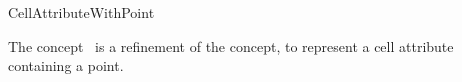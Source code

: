 \ccRefPageBegin
\begin{ccRefConcept}{CellAttributeWithPoint}

\ccDefinition
  
The concept \ccRefName\ is a refinement of the 
concept, to represent a cell attribute containing a point.

\ccRefines
{}  %



\ccTypes
{} %





\end{ccRefConcept}
